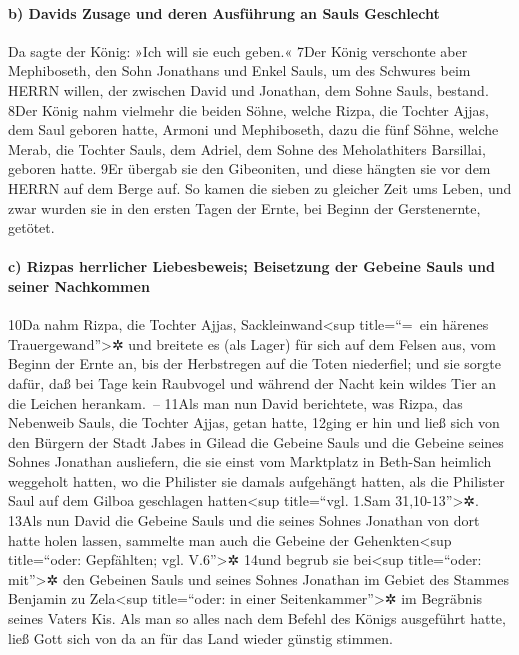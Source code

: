 \hypertarget{b-davids-zusage-und-deren-ausfuxfchrung-an-sauls-geschlecht}{%
\paragraph{b) Davids Zusage und deren Ausführung an Sauls
Geschlecht}\label{b-davids-zusage-und-deren-ausfuxfchrung-an-sauls-geschlecht}}

Da sagte der König: »Ich will sie euch geben.« 7Der König verschonte
aber Mephiboseth, den Sohn Jonathans und Enkel Sauls, um des Schwures
beim HERRN willen, der zwischen David und Jonathan, dem Sohne Sauls,
bestand. 8Der König nahm vielmehr die beiden Söhne, welche Rizpa, die
Tochter Ajjas, dem Saul geboren hatte, Armoni und Mephiboseth, dazu die
fünf Söhne, welche Merab, die Tochter Sauls, dem Adriel, dem Sohne des
Meholathiters Barsillai, geboren hatte. 9Er übergab sie den Gibeoniten,
und diese hängten sie vor dem HERRN auf dem Berge auf. So kamen die
sieben zu gleicher Zeit ums Leben, und zwar wurden sie in den ersten
Tagen der Ernte, bei Beginn der Gerstenernte, getötet.

\hypertarget{c-rizpas-herrlicher-liebesbeweis-beisetzung-der-gebeine-sauls-und-seiner-nachkommen}{%
\paragraph{c) Rizpas herrlicher Liebesbeweis; Beisetzung der Gebeine
Sauls und seiner
Nachkommen}\label{c-rizpas-herrlicher-liebesbeweis-beisetzung-der-gebeine-sauls-und-seiner-nachkommen}}

10Da nahm Rizpa, die Tochter Ajjas, Sackleinwand\textless sup
title=``=~ein härenes Trauergewand''\textgreater✲ und breitete es (als
Lager) für sich auf dem Felsen aus, vom Beginn der Ernte an, bis der
Herbstregen auf die Toten niederfiel; und sie sorgte dafür, daß bei Tage
kein Raubvogel und während der Nacht kein wildes Tier an die Leichen
herankam.~-- 11Als man nun David berichtete, was Rizpa, das Nebenweib
Sauls, die Tochter Ajjas, getan hatte, 12ging er hin und ließ sich von
den Bürgern der Stadt Jabes in Gilead die Gebeine Sauls und die Gebeine
seines Sohnes Jonathan ausliefern, die sie einst vom Marktplatz in
Beth-San heimlich weggeholt hatten, wo die Philister sie damals
aufgehängt hatten, als die Philister Saul auf dem Gilboa geschlagen
hatten\textless sup title=``vgl. 1.Sam 31,10-13''\textgreater✲. 13Als
nun David die Gebeine Sauls und die seines Sohnes Jonathan von dort
hatte holen lassen, sammelte man auch die Gebeine der
Gehenkten\textless sup title=``oder: Gepfählten; vgl. V.6''\textgreater✲
14und begrub sie bei\textless sup title=``oder: mit''\textgreater✲ den
Gebeinen Sauls und seines Sohnes Jonathan im Gebiet des Stammes Benjamin
zu Zela\textless sup title=``oder: in einer Seitenkammer''\textgreater✲
im Begräbnis seines Vaters Kis. Als man so alles nach dem Befehl des
Königs ausgeführt hatte, ließ Gott sich von da an für das Land wieder
günstig stimmen.

